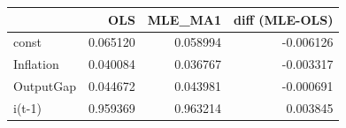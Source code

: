 \begin{tabular}{lrrr}
\toprule
 & OLS & MLE_MA1 & diff (MLE-OLS) \\
\midrule
const & 0.065120 & 0.058994 & -0.006126 \\
Inflation & 0.040084 & 0.036767 & -0.003317 \\
OutputGap & 0.044672 & 0.043981 & -0.000691 \\
i(t-1) & 0.959369 & 0.963214 & 0.003845 \\
\bottomrule
\end{tabular}
